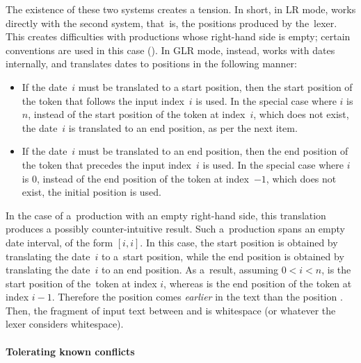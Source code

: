 The existence of these two systems creates a tension.
%
In short, in LR mode,
\menhir works directly with the second system,
that~is, the positions produced by the~lexer.
%
This creates difficulties with productions whose right-hand side is empty;
certain conventions are used in this case ().
%
In GLR mode, instead,
\menhir works with dates internally,
and translates dates to positions
in the following manner:
%
\begin{itemize}
\item
If the date~$i$ must be translated to a start position,
then the start position of the token that follows the input index~$i$
is used.
In the special case where $i$ is $n$,
instead of the start position of the token at index~$i$,
which does not exist,
the date~$i$ is translated to an end position,
as per the next item.
\item
If the date~$i$ must be translated to an end position,
then the end position of the token that precedes the input index~$i$
is used.
In the special case where $i$ is $0$,
instead of the end position of the token at index~$-1$,
which does not exist,
the initial position is used.
\end{itemize}

In the case of a~production with an empty right-hand side,
this translation produces a possibly counter-intuitive result.
Such a~production spans an empty date interval,
of the form $[i, i]$.
%
In this case,
the start position \kstartpos
is obtained by translating the date~$i$
to a~start position,
while
the end position \kendpos
is obtained by translating the date~$i$
to an end position.
%
As a~result,
assuming $0 < i < n$,
\kstartpos is the start position
of the~token at index $i$,
whereas
\kendpos is the end position
of the token at index $i-1$.
%
Therefore
the position \kendpos
comes \emph{earlier} in the text
than the position \kstartpos.
%
Then,
the fragment of input text between \kendpos and \kstartpos
is whitespace (or whatever the lexer considers whitespace).


\paragraph{Tolerating known conflicts}

